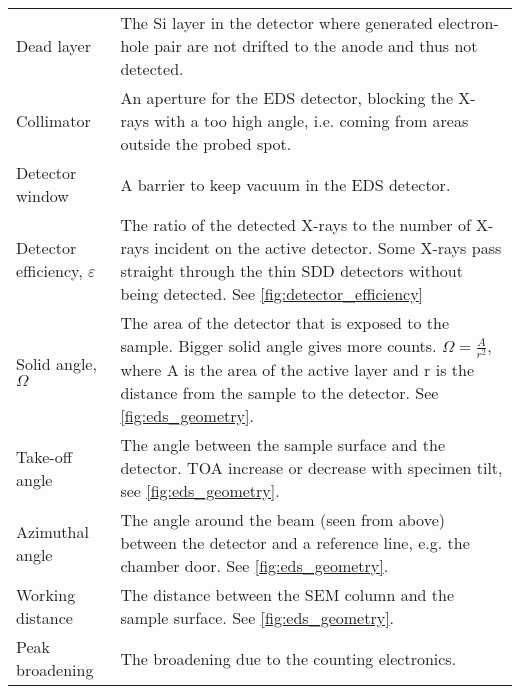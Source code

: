 \begin{table}[pht]
\begin{center}
\begin{tabular}{p{2.9cm}p{12cm}}
            Dead layer                         & The Si layer in the detector where generated electron-hole pair are not drifted to the anode and thus not detected.                                                                                                                                 \\
            Collimator                         & An aperture for the EDS detector, blocking the X-rays with a too high angle, i.e. coming from areas outside the probed spot.                                                                                                                        \\
            Detector window                    & A barrier to keep vacuum in the EDS detector.                                                                                                                                                                                                       \\
            Detector efficiency, $\varepsilon$ & The ratio of the detected X-rays to the number of X-rays incident on the active detector. Some X-rays pass straight through the thin SDD detectors without being detected. See \cref{fig:detector_efficiency}                                       \\
            Solid angle, $\Omega$              & The area of the detector that is exposed to the sample. Bigger solid angle gives more counts. $\Omega = \frac{A}{r^2}$, where A is the area of the active layer and r is the distance from the sample to the detector. See \cref{fig:eds_geometry}. \\
            Take-off angle                     & The angle between the sample surface and the detector. TOA increase or decrease with specimen tilt, see \cref{fig:eds_geometry}.                                                                                                                    \\
            Azimuthal angle                    & The angle around the beam (seen from above) between the detector and a reference line, e.g. the chamber door.  See \cref{fig:eds_geometry}.                                                                                                         \\
            Working distance                   & The distance between the SEM column and the sample surface. See \cref{fig:eds_geometry}.                                                                                                                                                            \\
            Peak broadening                    & The broadening due to the counting electronics.                                                                                                                                                                                                     \\
            \hline
        \end{tabular}
    \end{center}
\end{table}